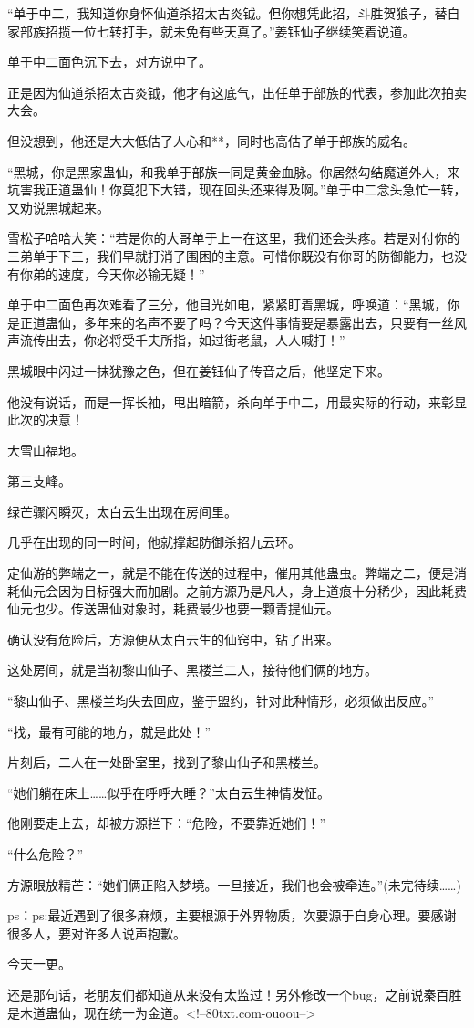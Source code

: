 \begin{this_body}
“单于中二，我知道你身怀仙道杀招太古炎钺。但你想凭此招，斗胜贺狼子，替自家部族招揽一位七转打手，就未免有些天真了。”姜钰仙子继续笑着说道。

单于中二面色沉下去，对方说中了。

正是因为仙道杀招太古炎钺，他才有这底气，出任单于部族的代表，参加此次拍卖大会。

但没想到，他还是大大低估了人心和**，同时也高估了单于部族的威名。

“黑城，你是黑家蛊仙，和我单于部族一同是黄金血脉。你居然勾结魔道外人，来坑害我正道蛊仙！你莫犯下大错，现在回头还来得及啊。”单于中二念头急忙一转，又劝说黑城起来。

雪松子哈哈大笑：“若是你的大哥单于上一在这里，我们还会头疼。若是对付你的三弟单于下三，我们早就打消了围困的主意。可惜你既没有你哥的防御能力，也没有你弟的速度，今天你必输无疑！”

单于中二面色再次难看了三分，他目光如电，紧紧盯着黑城，呼唤道：“黑城，你是正道蛊仙，多年来的名声不要了吗？今天这件事情要是暴露出去，只要有一丝风声流传出去，你必将受千夫所指，如过街老鼠，人人喊打！”

黑城眼中闪过一抹犹豫之色，但在姜钰仙子传音之后，他坚定下来。

他没有说话，而是一挥长袖，甩出暗箭，杀向单于中二，用最实际的行动，来彰显此次的决意！

大雪山福地。

第三支峰。

绿芒骤闪瞬灭，太白云生出现在房间里。

几乎在出现的同一时间，他就撑起防御杀招九云环。

定仙游的弊端之一，就是不能在传送的过程中，催用其他蛊虫。弊端之二，便是消耗仙元会因为目标强大而加剧。之前方源乃是凡人，身上道痕十分稀少，因此耗费仙元也少。传送蛊仙对象时，耗费最少也要一颗青提仙元。

确认没有危险后，方源便从太白云生的仙窍中，钻了出来。

这处房间，就是当初黎山仙子、黑楼兰二人，接待他们俩的地方。

“黎山仙子、黑楼兰均失去回应，鉴于盟约，针对此种情形，必须做出反应。”

“找，最有可能的地方，就是此处！”

片刻后，二人在一处卧室里，找到了黎山仙子和黑楼兰。

“她们躺在床上……似乎在呼呼大睡？”太白云生神情发怔。

他刚要走上去，却被方源拦下：“危险，不要靠近她们！”

“什么危险？”

方源眼放精芒：“她们俩正陷入梦境。一旦接近，我们也会被牵连。”(未完待续……)

ps：ps:最近遇到了很多麻烦，主要根源于外界物质，次要源于自身心理。要感谢很多人，要对许多人说声抱歉。

今天一更。

还是那句话，老朋友们都知道从来没有太监过！另外修改一个bug，之前说秦百胜是木道蛊仙，现在统一为金道。<!--80txt.com-ouoou-->

\end{this_body}

